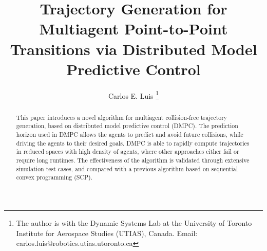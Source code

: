 \documentclass[letterpaper,10pt,conference,twocolumn]{ieeeconf}
\title{\LARGE \bf
Trajectory Generation for Multiagent Point-to-Point Transitions via Distributed Model Predictive Control
}
\author{Carlos E. Luis%
\thanks{The author is with the Dynamic Systems Lab at the University of Toronto Institute for Aerospace Studies (UTIAS), Canada. Email: carlos.luis@robotics.utias.utoronto.ca}%
}
\begin{document}
\maketitle
\thispagestyle{empty}
\pagestyle{empty}


\begin{abstract}
This paper introduces a novel algorithm for multiagent collision-free trajectory generation, based on distributed model predictive control (DMPC). The prediction horizon used in DMPC allows the agents to predict and avoid future collisions, while driving the agents to their desired goals. DMPC is able to rapidly compute trajectories in reduced spaces with high density of agents, where other approaches either fail or require long runtimes. The effectiveness of the algorithm is validated through extensive simulation test cases, and compared with a previous algorithm based on sequential convex programming (SCP).
\end{abstract}




\setcounter{section}{0}









% 
\end{document}
